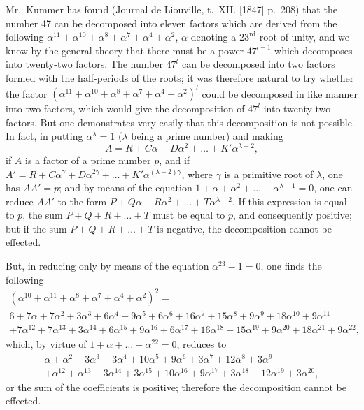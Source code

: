 \documentclass[11pt,a4paper]{book}
\begin{document}
Mr.~Kummer has found (Journal de Liouville, t.~XII. [1847] p.~208) that the number 47 can be decomposed into eleven factors which are derived from the following $\alpha^{11}+\alpha^{10}+\alpha^8+\alpha^7+\alpha^4+\alpha^2$, $\alpha$ denoting a $23^{\text{rd}}$ root of unity, and we know by the general theory that there must be a power $47^{l-1}$ which decomposes into twenty-two factors. The number $47^l$ can be decomposed into two factors formed with the half-periods of the roots; it was therefore natural to try whether the factor $(\alpha^{11}+\alpha^{10}+\alpha^8+\alpha^7+\alpha^4+\alpha^2)^l$ could be decomposed in like manner into two factors, which would give the decomposition of $47^l$ into twenty-two factors. But one demonstrates very easily that this decomposition is not possible. In fact, in putting $\alpha^\lambda = 1$ ($\lambda$ being a prime number) and making
\[
A = R + C\alpha + D\alpha^2 + \ldots + K'\alpha^{\lambda-2},
\]
if $A$ is a factor of a prime number $p$, and if $A' = R + C\alpha^{\gamma} + D\alpha^{2\gamma} + \ldots + K'\alpha^{(\lambda-2)\gamma}$, where $\gamma$ is a primitive root of $\lambda$, one has $AA' = p$; and by means of the equation $1+\alpha+\alpha^2+\ldots+\alpha^{\lambda-1}=0$, one can reduce $AA'$ to the form $P + Q\alpha + R\alpha^2 + \ldots + T\alpha^{\lambda-2}$. If this expression is equal to $p$, the sum $P+Q+R+\ldots+T$ must be equal to $p$, and consequently positive; but if the sum $P+Q+R+\ldots+T$ is negative, the decomposition cannot be effected.

\setcounter{page}{72}

But, in reducing only by means of the equation $\alpha^{23}-1=0$, one finds the following
\begin{multline*}
(\alpha^{10} + \alpha^{11} + \alpha^8 + \alpha^7 + \alpha^4 + \alpha^2)^2 = \\
6 + 7\alpha + 7\alpha^2 + 3\alpha^3 + 6\alpha^4 + 9\alpha^5 + 6\alpha^6 + 16\alpha^7 + 15\alpha^8 + 9\alpha^9 + 18\alpha^{10} + 9\alpha^{11} \\
+ 7\alpha^{12} + 7\alpha^{13} + 3\alpha^{14} + 6\alpha^{15} + 9\alpha^{16} + 6\alpha^{17} + 16\alpha^{18} + 15\alpha^{19} + 9\alpha^{20} + 18\alpha^{21} + 9\alpha^{22},
\end{multline*}
which, by virtue of $1+\alpha+\ldots+\alpha^{22}=0$, reduces to
\begin{multline*}
\alpha + \alpha^2 - 3\alpha^3 + 3\alpha^4 + 10\alpha^5 + 9\alpha^6 + 3\alpha^7 + 12\alpha^8 + 3\alpha^9 \\
+ \alpha^{12} + \alpha^{13} - 3\alpha^{14} + 3\alpha^{15} + 10\alpha^{16} + 9\alpha^{17} + 3\alpha^{18} + 12\alpha^{19} + 3\alpha^{20},
\end{multline*}
or the sum of the coefficients is positive; therefore the decomposition cannot be effected.
\end{document}
